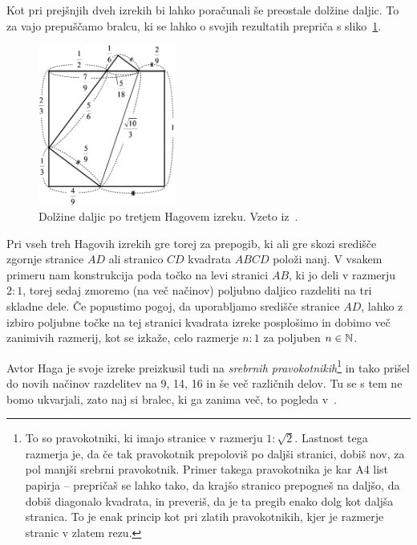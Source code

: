 Kot pri prejšnjih dveh izrekih bi lahko poračunali še preostale dolžine daljic. To za vajo prepuščamo bralcu, ki se lahko o svojih rezultatih prepriča s sliko~\ref{fig:hagov_izrek3_st}.

\begin{figure}[h]
    \centering
    \includegraphics[width=0.4\textwidth]{images/hagovi_izreki/hagov_izrek3_stevilke.png}
    \caption[Tretji Hagov izrek v številkah]{Dolžine daljic po tretjem Hagovem izreku. Vzeto iz~\cite[str. 19]{haga2008}.}
    \label{fig:hagov_izrek3_st}
\end{figure}

Pri vseh treh Hagovih izrekih gre torej za prepogib, ki ali gre skozi središče zgornje stranice $AD$ ali stranico $CD$ kvadrata $ABCD$ položi nanj. V vsakem primeru nam konstrukcija poda točko na levi stranici $AB$, ki jo deli v razmerju $2:1$, torej sedaj zmoremo (na več načinov) poljubno daljico razdeliti na tri skladne dele. Če popustimo pogoj, da uporabljamo središče stranice $AD$, lahko z izbiro poljubne točke na tej stranici kvadrata izreke posplošimo in dobimo več zanimivih razmerij, kot se izkaže, celo razmerje $n:1$ za poljuben $n \in \mathbb N$.

Avtor Haga je svoje izreke preizkusil tudi na \emph{srebrnih pravokotnikih}\footnote{To so pravokotniki, ki imajo stranice v razmerju $1 : \sqrt{2}$. Lastnost tega razmerja je, da če tak pravokotnik prepoloviš po daljši stranici, dobiš nov, za pol manjši srebrni pravokotnik. Primer takega pravokotnika je kar A4 list papirja -- prepričaš se lahko tako, da krajšo stranico prepogneš na daljšo, da dobiš diagonalo kvadrata, in preveriš, da je ta pregib enako dolg kot daljša stranica. To je enak princip kot pri zlatih pravokotnikih, kjer je razmerje stranic v zlatem rezu.} in tako prišel do novih načinov razdelitev na 9, 14, 16 in še več različnih delov. Tu se s tem ne bomo ukvarjali, zato naj si bralec, ki ga zanima več, to pogleda v~\cite[str.\ 21--32]{haga2008}.

